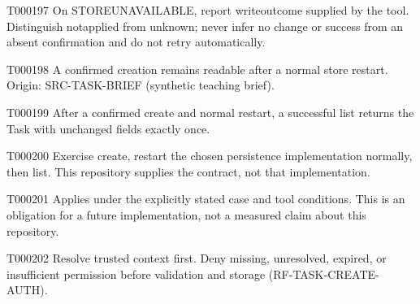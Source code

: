 \documentclass[11pt,a4paper]{article}
\begin{document}
\begin{atlasparagraph}{T000197}
On STORE\AtlasCharUnderscore{}UNAVAILABLE, report write\AtlasCharUnderscore{}outcome supplied by the tool. Distinguish not\AtlasCharUnderscore{}applied from unknown; never infer no change or success from an absent confirmation and do not retry automatically.
\end{atlasparagraph}
\begin{atlasparagraph}{T000198}
A confirmed creation remains readable after a normal store restart. Origin: SRC-TASK-BRIEF (synthetic teaching brief).
\end{atlasparagraph}
\begin{atlasparagraph}{T000199}
After a confirmed create and normal restart, a successful list returns the Task with unchanged fields exactly once.
\end{atlasparagraph}
\begin{atlasparagraph}{T000200}
Exercise create, restart the chosen persistence implementation normally, then list. This repository supplies the contract, not that implementation.
\end{atlasparagraph}
\begin{atlasparagraph}{T000201}
Applies under the explicitly stated case and tool conditions. This is an obligation for a future implementation, not a measured claim about this repository.
\end{atlasparagraph}
\begin{atlasparagraph}{T000202}
Resolve trusted context first. Deny missing, unresolved, expired, or insufficient permission before validation and storage (RF-TASK-CREATE-AUTH).
\end{atlasparagraph}
\end{document}
